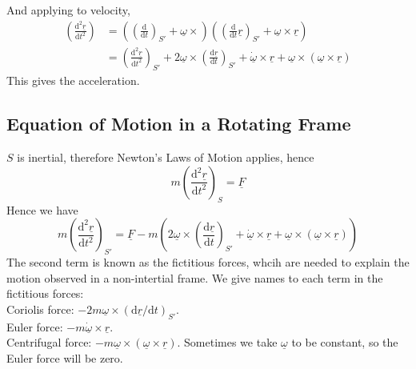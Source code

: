 And applying to velocity,
\begin{align*}
    \left( \frac{\mathrm d^2\underline{r}}{\mathrm dt^2} \right)
    &=\left( \left( \frac{\mathrm d}{\mathrm dt} \right)_{S'}+\underline{\omega}\times \right)\left( \left( \frac{\mathrm d}{\mathrm dt}\underline{r} \right)_{S'}+\underline{\omega}\times\underline{r} \right)\\
    &=\left( \frac{\mathrm d^2\underline{r}}{\mathrm dt^2} \right)_{S'}+2\underline{\omega}\times\left( \frac{\mathrm d\underline{r}}{\mathrm dt} \right)_{S'}+\underline{\dot{\omega}}\times\underline{r}+\underline{\omega}\times(\underline{\omega}\times\underline{r})
\end{align*}
This gives the acceleration.
\subsection{Equation of Motion in a Rotating Frame}
$S$ is inertial, therefore Newton's Laws of Motion applies, hence
$$m\left( \frac{\mathrm d^2\underline{r}}{\mathrm dt^2} \right)_S=\underline{F}$$
Hence we have
$$m\left( \frac{\mathrm d^2\underline{r}}{\mathrm dt^2} \right)_{S'}=\underline{F}-m\left( 2\underline{\omega}\times\left( \frac{\mathrm d\underline{r}}{\mathrm dt} \right)_{S'}+\underline{\dot{\omega}}\times\underline{r}+\underline{\omega}\times(\underline{\omega}\times\underline{r}) \right)$$
The second term is known as the fictitious forces, whcih are needed to explain the motion observed in a non-intertial frame.
We give names to each term in the fictitious forces:\\
Coriolis force: $-2m\underline{\omega}\times(\mathrm d\underline{r}/\mathrm dt)_{S'}$.\\
Euler force: $-m\underline{\dot{\omega}}\times\underline{r}$.\\
Centrifugal force: $-m\underline{\omega}\times(\underline{\omega}\times\underline{r})$.
Sometimes we take $\underline{\omega}$ to be constant, so the Euler force will be zero.
